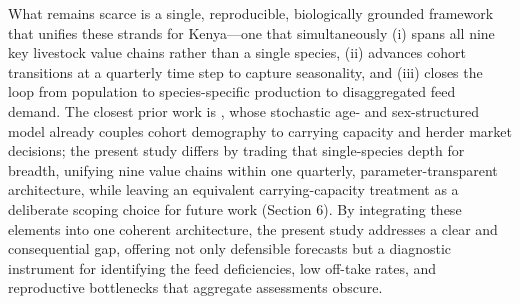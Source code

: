 What remains scarce is a single, reproducible, biologically grounded framework that unifies these strands for Kenya---one that simultaneously (i) spans all nine key livestock value chains rather than a single species, (ii) advances cohort transitions at a quarterly time step to capture seasonality, and (iii) closes the loop from population to species-specific production to disaggregated feed demand. The closest prior work is \citet{tuffa2017}, whose stochastic age- and sex-structured model already couples cohort demography to carrying capacity and herder market decisions; the present study differs by trading that single-species depth for breadth, unifying nine value chains within one quarterly, parameter-transparent architecture, while leaving an equivalent carrying-capacity treatment as a deliberate scoping choice for future work (Section 6). By integrating these elements into one coherent architecture, the present study addresses a clear and consequential gap, offering not only defensible forecasts but a diagnostic instrument for identifying the feed deficiencies, low off-take rates, and reproductive bottlenecks that aggregate assessments obscure.

